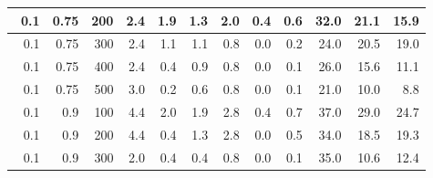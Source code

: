 \begin{longtable}{|r|r|r|r|r|r|r|r|r|r|r|r|}
        \hline \
        0.1                            & 0.75                    & 200                       & 2.4                       & 1.9                       & 1.3                       & 2.0                       & 0.4                       & 0.6                       & 32.0                      & 21.1                      & 15.9                      \\
        \hline \
        0.1                            & 0.75                    & 300                       & 2.4                       & 1.1                       & 1.1                       & 0.8                       & 0.0                       & 0.2                       & 24.0                      & 20.5                      & 19.0                       \\
        \hline \
        0.1                            & 0.75                     & 400                       & 2.4                       & 0.4                       & 0.9                       & 0.8                       & 0.0                       & 0.1                       & 26.0                      & 15.6                      & 11.1                      \\
        \hline \
        0.1                            & 0.75                     & 500                       & 3.0                       & 0.2                       & 0.6                       & 0.8                       & 0.0                       & 0.1                       & 21.0                      & 10.0                      & 8.8                      \\
        \hline \
        0.1                            & 0.9                     & 100                       & 4.4                       & 2.0                       & 1.9                       & 2.8                       & 0.4                       & 0.7                       & 37.0                      & 29.0                      & 24.7                      \\
        \hline \
        0.1                            & 0.9                     & 200                       & 4.4                       & 0.4                       & 1.3                       & 2.8                       & 0.0                       & 0.5                       & 34.0                      & 18.5                      & 19.3                       \\
        \hline \
        0.1                            & 0.9                     & 300                       & 2.0                       & 0.4                       & 0.4                       & 0.8                       & 0.0                       & 0.1                       & 35.0                      & 10.6                       & 12.4                       \\

\end{longtable}
